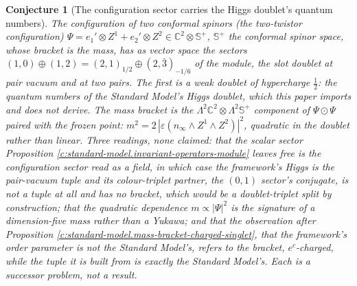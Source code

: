 \documentclass[11pt]{article}
\newtheorem{conjecture}[theorem]{Conjecture}
\theoremstyle{definition}
\theoremstyle{plain}
\newcommand{\changedmark}[2]{\marginpar{\raggedright\scriptsize\color{#1}#2}}
\providecommand{\C}{}\renewcommand{\C}{\mathbb{C}}
\providecommand{\CS}{}\renewcommand{\CS}{{\mathbb{S}^{+}}}
\begin{document}
\begin{conjecture}[The configuration sector carries the Higgs doublet's quantum numbers]\label{c:standard-model.configuration-sector-carries-higgs-doublets-quantum}
\changedmark{gray}{reworded}
The configuration of two conformal spinors (the two-twistor configuration) $\Psi = e_{1}' \otimes Z^{1} + e_{2}' \otimes Z^{2} \in \C^{2} \otimes \CS$, $\CS$ the conformal spinor space, whose bracket is the mass, has as vector space the sectors $(1,0) \oplus (1,2) = (2,1)_{1/2} \oplus (2,\bar{3})_{-1/6}$ of the module, the slot doublet at pair vacuum and at two pairs. The first is a weak doublet of hypercharge $\tfrac12$: the quantum numbers of the Standard Model's Higgs doublet, which this paper imports and does not derive. The mass bracket is the $\Lambda^{2}\C^{2} \otimes \Lambda^{2}\CS$ component of $\Psi \odot \Psi$ paired with the frozen point: $m^{2} = 2\,|\varepsilon(n_{\infty} \wedge Z^{1} \wedge Z^{2})|^{2}$, quadratic in the doublet rather than linear. Three readings, none claimed: that the scalar sector Proposition \ref{c:standard-model.invariant-operators-module} leaves free is the configuration sector read as a field, in which case the framework's Higgs is the pair-vacuum tuple and its colour-triplet partner, the $(0,1)$ sector's conjugate, is not a tuple at all and has no bracket, which would be a doublet-triplet split by construction; that the quadratic dependence $m \propto |\Psi|^{2}$ is the signature of a dimension-five mass rather than a Yukawa; and that the observation after Proposition \ref{c:standard-model.mass-bracket-charged-singlet}, that the framework's order parameter is not the Standard Model's, refers to the bracket, $e^{c}$-charged, while the tuple it is built from is exactly the Standard Model's. Each is a successor problem, not a result.
\end{conjecture}
\end{document}

